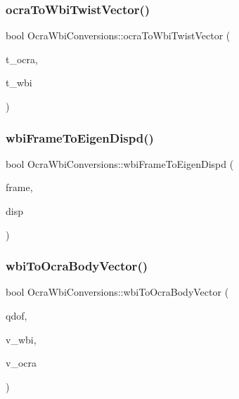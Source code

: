 \subsubsection{\texorpdfstring{ocra\+To\+Wbi\+Twist\+Vector()}{ocraToWbiTwistVector()}}
{\footnotesize\ttfamily bool Ocra\+Wbi\+Conversions\+::ocra\+To\+Wbi\+Twist\+Vector (\begin{DoxyParamCaption}\item[{Eigen\+::\+Twistd \&}]{t\+\_\+ocra,  }\item[{Eigen\+::\+Twistd \&}]{t\+\_\+wbi }\end{DoxyParamCaption})\hspace{0.3cm}{\ttfamily [static]}}

\hypertarget{classocra__icub_1_1OcraWbiConversions_a403627efa183c8ddbbccabf0dcd5bcaf}{}\label{classocra__icub_1_1OcraWbiConversions_a403627efa183c8ddbbccabf0dcd5bcaf} 
\subsubsection{\texorpdfstring{wbi\+Frame\+To\+Eigen\+Dispd()}{wbiFrameToEigenDispd()}}
{\footnotesize\ttfamily bool Ocra\+Wbi\+Conversions\+::wbi\+Frame\+To\+Eigen\+Dispd (\begin{DoxyParamCaption}\item[{const wbi\+::\+Frame \&}]{frame,  }\item[{Eigen\+::\+Displacementd \&}]{disp }\end{DoxyParamCaption})\hspace{0.3cm}{\ttfamily [static]}}

\hypertarget{classocra__icub_1_1OcraWbiConversions_ae8839dfdc97e2239f4ed8a257d32fb21}{}\label{classocra__icub_1_1OcraWbiConversions_ae8839dfdc97e2239f4ed8a257d32fb21} 
\subsubsection{\texorpdfstring{wbi\+To\+Ocra\+Body\+Vector()}{wbiToOcraBodyVector()}}
{\footnotesize\ttfamily bool Ocra\+Wbi\+Conversions\+::wbi\+To\+Ocra\+Body\+Vector (\begin{DoxyParamCaption}\item[{int}]{qdof,  }\item[{const Eigen\+::\+Vector\+Xd \&}]{v\+\_\+wbi,  }\item[{Eigen\+::\+Vector\+Xd \&}]{v\+\_\+ocra }\end{DoxyParamCaption})\hspace{0.3cm}{\ttfamily [static]}}

